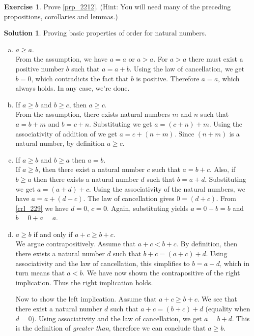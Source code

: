 \documentclass[a4paper, twocolumn]{report}
\newcounter{exercise} \numberwithin{exercise}{section}
\theoremstyle{definition}
\newtheorem{exc}[exercise]{Exercise}
\theoremstyle{solution}
\newtheorem*{sltn}{Solution}
\begin{document}
\begin{exc}
  Prove \ref{prp_2212}. (Hint: You will need many of the preceding propositions, corollaries and lemmas.)
\end{exc}
\begin{sltn}
  Proving basic properties of order for natural numbers.
  \begin{enumerate}[(a)]
    \item $a \geq a$. \\
      [0.2cm]
      From the assumption, we have $a = a$ or $a > a$. For $a > a$ there must
      exist a positive number $ b $ such that $a = a + b$. Using the law of
      cancellation, we get $b = 0$, which contradicts the fact that $b$ is
      positive. Therefore $a = a$, which always holds. In any case, we're done.

    \item If $a \geq b$ and $b \geq c$, then $a \geq c$.\\
      [0.2cm]
      From the assumption, there exists natural numbers $m$ and $n$ such that
      $a = b + m$ and $b = c + n$. Substituting we get $a = (c + n) + m$.
      Using the associativity of addition of we get $a = c + (n + m)$. Since
      $(n + m)$ is a natural number, by definition $ a \geq c$.

    \item If $a \geq b$ and $b \geq a$ then $a = b$. \\
      [0.2cm]
      If $a \geq b$, then there exist a natural number $c$ such that $a = b +
      c$.  Also, if $b \geq a$ then there exists a natural number $d$ such that
      $b = a + d$.  Substituting we get $a = (a + d) + c$. Using the
      associativity of the natural numbers, we have $a = a + (d + c)$. The law
      of cancellation gives $0 = (d + c)$. From \ref{crl_229} we have $d = 0$,
      $c = 0$.  Again, substituting yields $a = 0 + b = b$ and $b = 0 + a = a$.

    \item $a \geq b$ if and only if $a + c \geq b + c$.\\
      [0.2cm]
      We argue contrapositively.  Assume that $a + c < b + c$. By definition,
      then there exists a natural number $d$ such that $b + c = (a + c) + d$.
      Using associativity and the law of cancellation, this simplifies to $b =
      a + d$, which in turn means that $a < b$. We have now shown the
      contrapositive of the right implication. Thus the right implication holds.

      Now to show the left implication.  Assume that $a + c \geq b + c$. We see
      that there exist a natural number $d$ such that $a + c = (b + c) + d$
      (equality when $d = 0$). Using associativity and the law of
      cancellation, we get $a = b + d$.  This is the definition of
      \textit{greater than}, therefore we can conclude that $a \geq b$. 
      

\end{enumerate}
\end{sltn}
\end{document}
